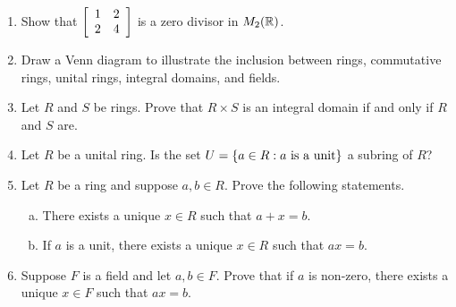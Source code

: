 \documentclass[11pt,fleqn,dvipsnames,usenames]{article}
\newcommand{\p}{\noindent}
\begin{document}
\newpage

\p {\huge \S4.4 Problems}
\vsp

\begin{enumerate}[1.]
\item Show that $\MATRIX{rr}{1 & 2\\2 & 4}$ is a zero divisor in $M_{2}(\REAL)$.

\item Draw a Venn diagram to illustrate the inclusion between rings, commutative rings, unital rings, integral domains, and fields.

\item Let $R$ and $S$ be rings.  Prove that $R\times S$ is an integral domain if and only if $R$ and $S$ are.

\item Let $R$ be a unital ring.  Is the set $U = \SET{a\in R:a\text{ is a unit}}$ a subring of $R$?

\item Let $R$ be a ring and suppose $a,b\in R$.  Prove the following statements.
\begin{enumerate}[(a)]
\item There exists a unique $x\in R$ such that $a + x = b$.
\item If $a$ is a unit, there exists a unique $x\in R$ such that $ax=b$.   
\end{enumerate}

\item Suppose $F$ is a field and let $a,b\in F$.  Prove that if $a$ is non-zero, there exists a unique $x\in F$ such that $ax = b$.

\end{enumerate}
\end{document}
